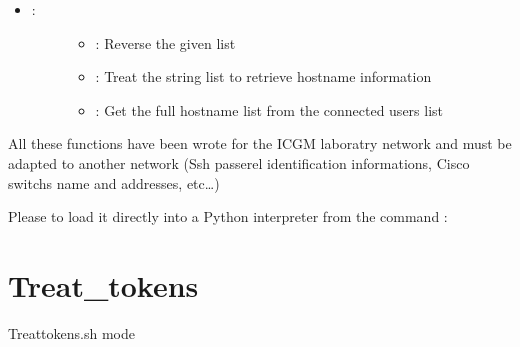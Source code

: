 \documentclass[letterpaper,10pt,english]{sphinxmanual}
\begin{document}
\begin{itemize}
\begin{description}
\begin{itemize}
\end{itemize}

\end{description}

\item {} \begin{description}
\item[{:}] \leavevmode\begin{itemize}
\item {} 
\sphinxAtStartPar
{} : Reverse the given list

\item {} 
\sphinxAtStartPar
{} : Treat the string list to retrieve hostname information

\item {} 
\sphinxAtStartPar
{} : Get the full hostname list from the connected users list

\end{itemize}

\end{description}

\end{itemize}

\sphinxAtStartPar
All these functions have been wrote for the ICGM laboratry network and must be adapted to another network (Ssh passerel identification informations, Cisco switchs name and addresses, etc…)

\sphinxAtStartPar
Please to load it directly into a Python interpreter from the command :

\begin{sphinxVerbatim}[commandchars=\\\{\}]
   
\end{sphinxVerbatim}

\sphinxstepscope


\chapter{Treat\_tokens}
\label{\detokenize{Treat_tokens:treat-tokens}}\label{\detokenize{Treat_tokens::doc}}
\begin{sphinxVerbatim}[commandchars=\\\{\}]
Treat\PYGZus{}tokens.sh \PYGZlt{}mode\PYGZgt{}
\end{sphinxVerbatim}
\end{document}
